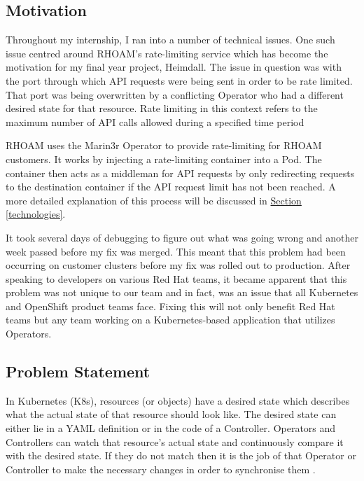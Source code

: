 \documentclass{article}
\begin{document}
\subsection{Motivation} 
Throughout my internship, I ran into a number of technical issues. One such issue centred around RHOAM's rate-limiting service which has become the motivation for my final year project, Heimdall. The issue in question was with the port through which API requests were being sent in order to be rate limited. That port was being overwritten by a conflicting Operator who had a different desired state for that resource. Rate limiting in this context refers to the maximum number of API calls allowed during a specified time period \cite{understanding-apis} \\\par RHOAM uses the Marin3r Operator to provide rate-limiting for RHOAM customers. It works by injecting a rate-limiting container into a Pod. The container then acts as a middleman for API requests by only redirecting requests to the destination container if the API request limit has not been reached. A more detailed explanation of this process will be discussed in \hyperlink{technologies}{Section \ref{technologies}}. \\\par It took several days of debugging to figure out what was going wrong and another week passed before my fix was merged. This meant that this problem had been occurring on customer clusters before my fix was rolled out to production. After speaking to developers on various Red Hat teams, it became apparent that this problem was not unique to our team and in fact, was an issue that all Kubernetes and OpenShift product teams face. Fixing this will not only benefit Red Hat teams but any team working on a Kubernetes-based application that utilizes Operators.



\subsection{Problem Statement}
In Kubernetes (K8s), resources (or objects) have a desired state which describes what the actual state of that resource should look like. The desired state can either lie in a YAML definition or in the code of a Controller. Operators and Controllers can watch that resource's actual state and continuously compare it with the desired state. If they do not match then it is the job of that Operator or Controller to make the necessary changes in order to synchronise them \cite{operator-pattern}.
\end{document}
